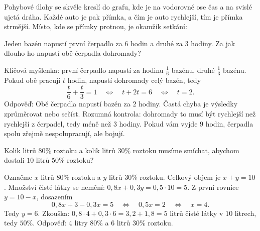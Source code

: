 Pohybové úlohy se skvěle kreslí do grafu, kde je na vodorovné ose čas a na svislé ujetá dráha. Každé auto je pak přímka, a čím je auto rychlejší, tím je přímka strmější. Místo, kde se přímky protnou, je okamžik setkání:
\begin{center}
\end{center}

\begin{example}
  Jeden bazén napustí první čerpadlo za $6$ hodin a druhé za $3$ hodiny. Za jak dlouho ho napustí obě čerpadla dohromady?

  Klíčová myšlenka: první čerpadlo napustí za hodinu $\frac{1}{6}$ bazénu, druhé $\frac{1}{3}$ bazénu. Pokud obě pracují $t$ hodin, napustí dohromady celý bazén, tedy
  \begin{equation*}
    \frac{t}{6} + \frac{t}{3} = 1\quad\Leftrightarrow\quad t + 2t = 6\quad\Leftrightarrow\quad t = 2.
  \end{equation*}
  Odpověď: Obě čerpadla napustí bazén za $2$ hodiny. Častá chyba je výsledky zprůměrovat nebo sečíst. Rozumná kontrola: dohromady to musí být rychlejší než rychlejší z čerpadel, tedy méně než $3$ hodiny. Pokud vám vyjde $9$ hodin, čerpadla spolu zřejmě nespolupracují, ale bojují.
\end{example}

\begin{example}[ (směsi)]
  Kolik litrů $80\%$ roztoku a kolik litrů $30\%$ roztoku musíme smíchat, abychom dostali $10$ litrů $50\%$ roztoku?

  Označme $x$ litrů $80\%$ roztoku a $y$ litrů $30\%$ roztoku. Celkový objem je $x + y = 10$. Množství čisté látky se nemění: $0{,}8x + 0{,}3y = 0{,}5\cdot 10 = 5$. Z první rovnice $y = 10 - x$, dosazením
  \begin{equation*}
    0{,}8x + 3 - 0{,}3x = 5\quad\Leftrightarrow\quad 0{,}5x = 2\quad\Leftrightarrow\quad x = 4.
  \end{equation*}
  Tedy $y = 6$. Zkouška: $0{,}8\cdot 4 + 0{,}3\cdot 6 = 3{,}2 + 1{,}8 = 5$ litrů čisté látky v $10$ litrech, tedy $50\%$. Odpověď: $4$ litry $80\%$ a $6$ litrů $30\%$ roztoku.
\end{example}

